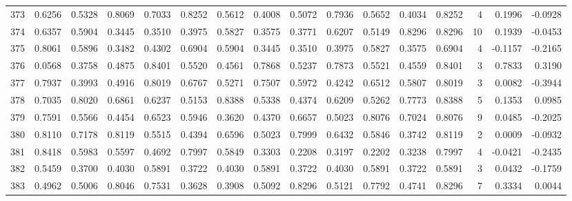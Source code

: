 \begin{tabular}{lrrrrrrrrrrrrrrr}
373 &      0.6256 &  0.5328 &  0.8069 &  0.7033 &  0.8252 &  0.5612 &  0.4008 &  0.5072 &  0.7936 &  0.5652 &   0.4034 &     0.8252 &      4 &                    0.1996 &                    -0.0928 \\
374 &      0.6357 &  0.5904 &  0.3445 &  0.3510 &  0.3975 &  0.5827 &  0.3575 &  0.3771 &  0.6207 &  0.5149 &   0.8296 &     0.8296 &     10 &                    0.1939 &                    -0.0453 \\
375 &      0.8061 &  0.5896 &  0.3482 &  0.4302 &  0.6904 &  0.5904 &  0.3445 &  0.3510 &  0.3975 &  0.5827 &   0.3575 &     0.6904 &      4 &                   -0.1157 &                    -0.2165 \\
376 &      0.0568 &  0.3758 &  0.4875 &  0.8401 &  0.5520 &  0.4561 &  0.7868 &  0.5237 &  0.7873 &  0.5521 &   0.4559 &     0.8401 &      3 &                    0.7833 &                     0.3190 \\
377 &      0.7937 &  0.3993 &  0.4916 &  0.8019 &  0.6767 &  0.5271 &  0.7507 &  0.5972 &  0.4242 &  0.6512 &   0.5807 &     0.8019 &      3 &                    0.0082 &                    -0.3944 \\
378 &      0.7035 &  0.8020 &  0.6861 &  0.6237 &  0.5153 &  0.8388 &  0.5338 &  0.4374 &  0.6209 &  0.5262 &   0.7773 &     0.8388 &      5 &                    0.1353 &                     0.0985 \\
379 &      0.7591 &  0.5566 &  0.4454 &  0.6523 &  0.5946 &  0.3620 &  0.4370 &  0.6657 &  0.5023 &  0.8076 &   0.7024 &     0.8076 &      9 &                    0.0485 &                    -0.2025 \\
380 &      0.8110 &  0.7178 &  0.8119 &  0.5515 &  0.4394 &  0.6596 &  0.5023 &  0.7999 &  0.6432 &  0.5846 &   0.3742 &     0.8119 &      2 &                    0.0009 &                    -0.0932 \\
381 &      0.8418 &  0.5983 &  0.5597 &  0.4692 &  0.7997 &  0.5849 &  0.3303 &  0.2208 &  0.3197 &  0.2202 &   0.3238 &     0.7997 &      4 &                   -0.0421 &                    -0.2435 \\
382 &      0.5459 &  0.3700 &  0.4030 &  0.5891 &  0.3722 &  0.4030 &  0.5891 &  0.3722 &  0.4030 &  0.5891 &   0.3722 &     0.5891 &      3 &                    0.0432 &                    -0.1759 \\
383 &      0.4962 &  0.5006 &  0.8046 &  0.7531 &  0.3628 &  0.3908 &  0.5092 &  0.8296 &  0.5121 &  0.7792 &   0.4741 &     0.8296 &      7 &                    0.3334 &                     0.0044 \\

\end{tabular}
